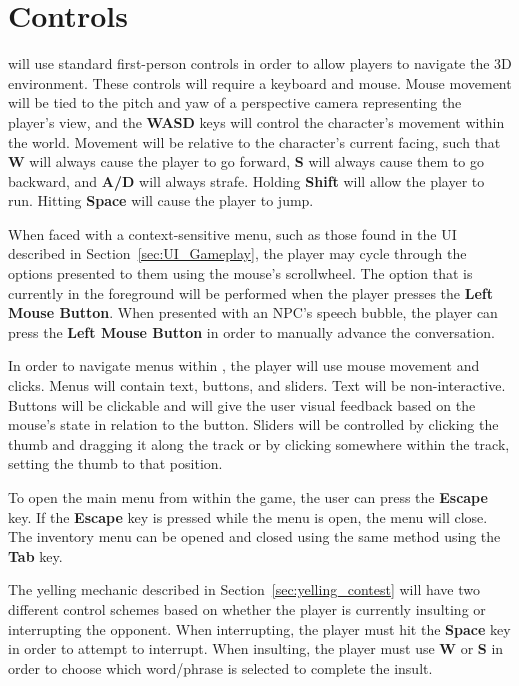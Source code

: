 \section{Controls}
\ourgame{} will use standard first-person controls in order to allow players to navigate the 3D environment. These controls will require a keyboard and mouse. Mouse movement will be tied to the pitch and yaw of a perspective camera representing the player's view, and the \textbf{WASD} keys will control the character's movement within the world. Movement will be relative to the character's current facing, such that \textbf{W} will always cause the player to go forward, \textbf{S} will always cause them to go backward, and \textbf{A/D} will always strafe. Holding \textbf{Shift} will allow the player to run. Hitting \textbf{Space} will cause the player to jump.

When faced with a context-sensitive menu, such as those found in the UI described in Section~\ref{sec:UI_Gameplay}, the player may cycle through the options presented to them using the mouse's scrollwheel. The option that is currently in the foreground will be performed when the player presses the \textbf{Left Mouse Button}. When presented with an NPC's speech bubble, the player can press the \textbf{Left Mouse Button} in order to manually advance the conversation.

In order to navigate menus within \ourgame{}, the player will use mouse movement and clicks. Menus will contain text, buttons, and sliders. Text will be non-interactive. Buttons will be clickable and will give the user visual feedback based on the mouse's state in relation to the button. Sliders will be controlled by clicking the thumb and dragging it along the track or by clicking somewhere within the track, setting the thumb to that position.

To open the main menu from within the game, the user can press the \textbf{Escape} key. If the \textbf{Escape} key is pressed while the menu is open, the menu will close. The inventory menu can be opened and closed using the same method using the \textbf{Tab} key.

The yelling mechanic described in Section~\ref{sec:yelling_contest} will have two different control schemes based on whether the player is currently insulting or interrupting the opponent. When interrupting, the player must hit the \textbf{Space} key in order to attempt to interrupt. When insulting, the player must use \textbf{W} or \textbf{S} in order to choose which word/phrase is selected to complete the insult. 

